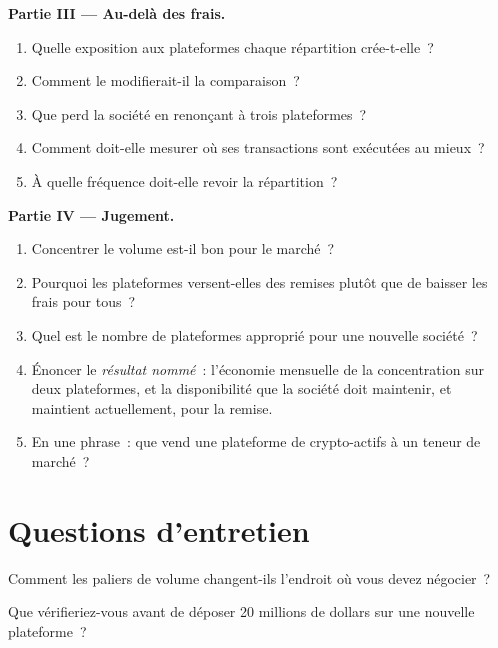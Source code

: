 \begin{problem}
\medskip\noindent\textbf{Partie III --- Au-delà des frais.}
\begin{enumerate}[resume]
\item Quelle exposition aux plateformes chaque répartition crée-t-elle~?
\item Comment le  modifierait-il la comparaison~?
\item Que perd la société en renonçant à trois plateformes~?
\item Comment doit-elle mesurer où ses transactions sont exécutées au mieux~?
\item À quelle fréquence doit-elle revoir la répartition~?
\end{enumerate}

\medskip\noindent\textbf{Partie IV --- Jugement.}
\begin{enumerate}[resume]
\item Concentrer le volume est-il bon pour le marché~?
\item Pourquoi les plateformes versent-elles des remises plutôt que de baisser les frais pour tous~?
\item Quel est le nombre de plateformes approprié pour une nouvelle société~?
\item Énoncer le \emph{résultat nommé}~: l'économie mensuelle de la concentration sur deux plateformes, et la disponibilité que la société doit maintenir, et maintient actuellement, pour la remise.
\item En une phrase~: que vend une plateforme de crypto-actifs à un teneur de marché~?
\end{enumerate}
\end{problem}

\section{Questions d'entretien}

\begin{interviewq}\label{iq:m3:getting-access-crypto-venues:1}
Comment les paliers de volume changent-ils l'endroit où vous devez négocier~?
\end{interviewq}

\begin{interviewq}\label{iq:m3:getting-access-crypto-venues:2}
Que vérifieriez-vous avant de déposer 20 millions de dollars sur une nouvelle plateforme~?
\end{interviewq}


